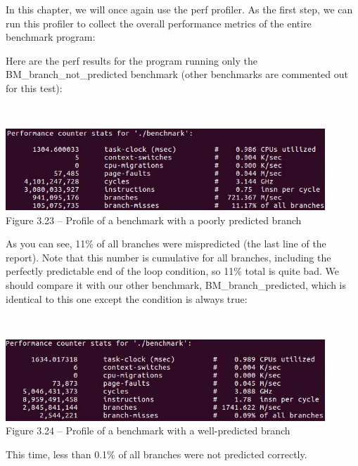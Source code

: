 In this chapter, we will once again use the perf profiler. As the first step, we can run this profiler to collect the overall performance metrics of the entire benchmark program:


Here are the perf results for the program running only the BM\_branch\_not\_predicted benchmark (other benchmarks are commented out for this test):

\hspace*{\fill} \\ %
\begin{center}
\includegraphics[width=0.9\textwidth]{content/1/chapter3/images/23.jpg}\\
Figure 3.23 – Profile of a benchmark with a poorly predicted branch
\end{center}

As you can see, 11\% of all branches were mispredicted (the last line of the report). Note that this number is cumulative for all branches, including the perfectly predictable end of the loop condition, so 11\% total is quite bad. We should compare it with our other benchmark, BM\_branch\_predicted, which is identical to this one except the condition is always true:

\hspace*{\fill} \\ %
\begin{center}
\includegraphics[width=0.9\textwidth]{content/1/chapter3/images/24.jpg}\\
Figure 3.24 – Profile of a benchmark with a well-predicted branch
\end{center}

This time, less than 0.1\% of all branches were not predicted correctly.

